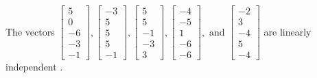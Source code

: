 \begin{exercise}
\begin{exerciseStatement}
  \end{exerciseStatement}
  \begin{exerciseAnswer}
   The vectors \(\left[\begin{array}{r}
5 \\
0 \\
-6 \\
-3 \\
-1
\end{array}\right] , \left[\begin{array}{r}
-3 \\
5 \\
5 \\
5 \\
-1
\end{array}\right] , \left[\begin{array}{r}
5 \\
5 \\
-1 \\
-3 \\
3
\end{array}\right] , \left[\begin{array}{r}
-4 \\
-5 \\
1 \\
-6 \\
-6
\end{array}\right] , \text{ and } \left[\begin{array}{r}
-2 \\
3 \\
-4 \\
5 \\
-4
\end{array}\right]\) are 
  	 linearly independent  .
  


  \end{exerciseAnswer}
\end{exercise}